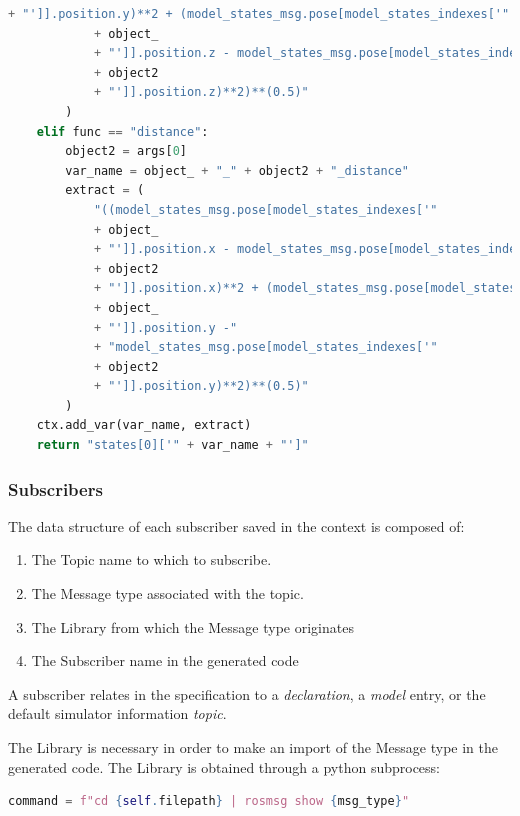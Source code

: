 \begin{lstlisting}[language=Python]
            + "']].position.y)**2 + (model_states_msg.pose[model_states_indexes['"
            + object_
            + "']].position.z - model_states_msg.pose[model_states_indexes['"
            + object2
            + "']].position.z)**2)**(0.5)"
        )
    elif func == "distance":
        object2 = args[0]
        var_name = object_ + "_" + object2 + "_distance"
        extract = (
            "((model_states_msg.pose[model_states_indexes['"
            + object_
            + "']].position.x - model_states_msg.pose[model_states_indexes['"
            + object2
            + "']].position.x)**2 + (model_states_msg.pose[model_states_indexes['"
            + object_
            + "']].position.y -"
            + "model_states_msg.pose[model_states_indexes['"
            + object2
            + "']].position.y)**2)**(0.5)"
        )
    ctx.add_var(var_name, extract)
    return "states[0]['" + var_name + "']"
\end{lstlisting}


\subsubsection{Subscribers}
\label{sssec:compileSubs}

The data structure of each subscriber saved in the context is composed of:

\begin{enumerate}
    \item The Topic name to which to subscribe.
    \item The Message type associated with the topic.
    \item The Library from which the Message type originates
    \item The Subscriber name in the generated code
\end{enumerate}

A subscriber relates in the specification to a \textit{declaration}, a \textit{model} entry, or the default simulator information \textit{topic}.

The Library is necessary in order to make an import of the Message type in the generated code. The Library is obtained through a python subprocess:

\begin{lstlisting}[language=Python]
    command = f"cd {self.filepath} | rosmsg show {msg_type}"
\end{lstlisting}

